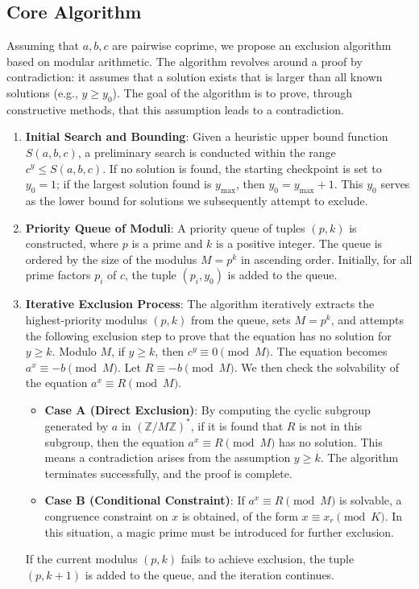 \documentclass{article}
\begin{document}
\subsection{Core Algorithm}
Assuming that $a,b,c$ are pairwise coprime, we propose an exclusion algorithm based on modular arithmetic. The algorithm revolves around a proof by contradiction: it assumes that a solution exists that is larger than all known solutions (e.g., $y \ge y_0$). The goal of the algorithm is to prove, through constructive methods, that this assumption leads to a contradiction.

\begin{enumerate}
    \item \textbf{Initial Search and Bounding}:
    Given a heuristic upper bound function $S(a, b, c)$, a preliminary search is conducted within the range $c^y \le S(a, b, c)$. If no solution is found, the starting checkpoint is set to $y_0=1$; if the largest solution found is $y_{\max}$, then $y_0=y_{\max}+1$. This $y_0$ serves as the lower bound for solutions we subsequently attempt to exclude.

    \item \textbf{Priority Queue of Moduli}:
    A priority queue of tuples $(p, k)$ is constructed, where $p$ is a prime and $k$ is a positive integer. The queue is ordered by the size of the modulus $M=p^k$ in ascending order. Initially, for all prime factors $p_i$ of $c$, the tuple $(p_i, y_0)$ is added to the queue.

    \item \textbf{Iterative Exclusion Process}:
    The algorithm iteratively extracts the highest-priority modulus $(p, k)$ from the queue, sets $M=p^k$, and attempts the following exclusion step to prove that the equation has no solution for $y \ge k$.
    Modulo $M$, if $y \ge k$, then $c^y \equiv 0 \pmod M$. The equation becomes $a^x \equiv -b \pmod M$. Let $R \equiv -b \pmod M$. We then check the solvability of the equation $a^x \equiv R \pmod M$.
    \begin{itemize}
        \item \textbf{Case A (Direct Exclusion)}: By computing the cyclic subgroup generated by $a$ in $(\mathbb{Z}/M\mathbb{Z})^*$, if it is found that $R$ is not in this subgroup, then the equation $a^x \equiv R \pmod M$ has no solution. This means a contradiction arises from the assumption $y \ge k$. The algorithm terminates successfully, and the proof is complete.
        \item \textbf{Case B (Conditional Constraint)}: If $a^x \equiv R \pmod M$ is solvable, a congruence constraint on $x$ is obtained, of the form $x \equiv x_r \pmod K$. In this situation, a magic prime must be introduced for further exclusion.
    \end{itemize}
    If the current modulus $(p,k)$ fails to achieve exclusion, the tuple $(p, k+1)$ is added to the queue, and the iteration continues.


\end{enumerate}
\end{document}
